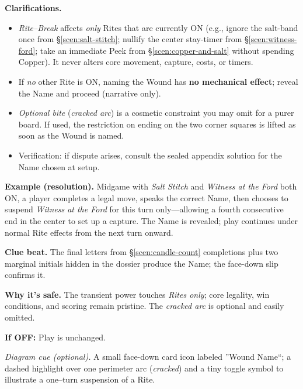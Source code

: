 \documentclass[11pt]{article}
\numberwithin{equation}{section} %
\theoremstyle{plain} %
\theoremstyle{definition} %
\theoremstyle{remark} %
\begin{document}
\medskip
\noindent\textbf{Clarifications.}
\begin{itemize}\setlength\itemsep{0.25em}
  \item \textit{Rite--Break} affects \emph{only} Rites that are currently \textsc{ON} (e.g., ignore the salt-band once from \S\ref{scen:salt-stitch}; nullify the center stay-timer from \S\ref{scen:witness-ford}; take an immediate Peek from \S\ref{scen:copper-and-salt} without spending Copper). It never alters core movement, capture, costs, or timers.
  \item If \emph{no} other Rite is \textsc{ON}, naming the Wound has \textbf{no mechanical effect}; reveal the Name and proceed (narrative only).
  \item \textit{Optional bite} (\emph{cracked arc}) is a cosmetic constraint you may omit for a purer board. If used, the restriction on ending on the two corner squares is lifted as soon as the Wound is named.
  \item Verification: if dispute arises, consult the sealed appendix solution for the Name chosen at setup.
\end{itemize}

\medskip
\noindent\textbf{Example (resolution).}  
Midgame with \emph{Salt Stitch} and \emph{Witness at the Ford} both \textsc{ON}, a player completes a legal move, speaks the correct Name, then chooses to suspend \emph{Witness at the Ford} for this turn only---allowing a fourth consecutive end in the center to set up a capture. The Name is revealed; play continues under normal Rite effects from the next turn onward.

\medskip
\noindent\textbf{Clue beat.} The final letters from \S\ref{scen:candle-count} completions plus two marginal initials hidden in the dossier produce the Name; the face-down slip confirms it.

\medskip
\noindent\textbf{Why it's safe.} The transient power touches \emph{Rites only}; core legality, win conditions, and scoring remain pristine. The \emph{cracked arc} is optional and easily omitted.

\medskip
\noindent\textbf{If \textsc{OFF}:} Play is unchanged.

\medskip
\noindent\textit{Diagram cue (optional).} A small face-down card icon labeled ''Wound Name``; a dashed highlight over one perimeter arc (\emph{cracked}) and a tiny toggle symbol to illustrate a one--turn suspension of a Rite.

\clearpage


\end{document}

